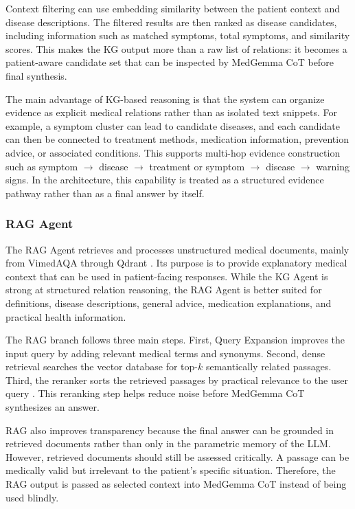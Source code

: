 Context filtering can use embedding similarity between the patient context and disease descriptions. The filtered results are then ranked as disease candidates, including information such as matched symptoms, total symptoms, and similarity scores. This makes the KG output more than a raw list of relations: it becomes a patient-aware candidate set that can be inspected by MedGemma CoT before final synthesis.

The main advantage of KG-based reasoning is that the system can organize evidence as explicit medical relations rather than as isolated text snippets. For example, a symptom cluster can lead to candidate diseases, and each candidate can then be connected to treatment methods, medication information, prevention advice, or associated conditions. This supports multi-hop evidence construction such as symptom $\rightarrow$ disease $\rightarrow$ treatment or symptom $\rightarrow$ disease $\rightarrow$ warning signs. In the architecture, this capability is treated as a structured evidence pathway rather than as a final answer by itself.

\subsubsection{RAG Agent}

The RAG Agent retrieves and processes unstructured medical documents, mainly from VimedAQA through Qdrant \cite{vimedaqa_dataset,qdrant_doc}. Its purpose is to provide explanatory medical context that can be used in patient-facing responses. While the KG Agent is strong at structured relation reasoning, the RAG Agent is better suited for definitions, disease descriptions, general advice, medication explanations, and practical health information.

The RAG branch follows three main steps. First, Query Expansion improves the input query by adding relevant medical terms and synonyms. Second, dense retrieval searches the vector database for top-$k$ semantically related passages. Third, the reranker sorts the retrieved passages by practical relevance to the user query \cite{reranking_search}. This reranking step helps reduce noise before MedGemma CoT synthesizes an answer.

RAG also improves transparency because the final answer can be grounded in retrieved documents rather than only in the parametric memory of the LLM. However, retrieved documents should still be assessed critically. A passage can be medically valid but irrelevant to the patient's specific situation. Therefore, the RAG output is passed as selected context into MedGemma CoT instead of being used blindly.

